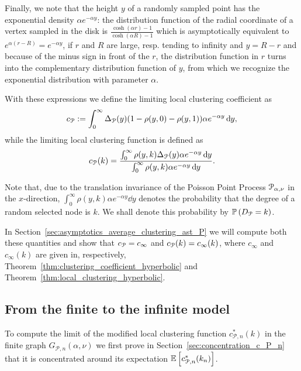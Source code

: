 Finally, we note that the height $y$ of a randomly sampled point has the exponential density $\alpha e^{-\alpha y}$: the distribution function of the radial coordinate of a vertex sampled in the disk is $\frac{\cosh(\alpha  r)-1}{\cosh(\alpha R)-1}$ which is asymptotically equivalent to $e^{\alpha(r-R)} = e^{-\alpha y}$, if $r$ and $R$ are large, resp. tending to infinity and $y=R-r$ and because of the minus sign in front of the $r$, the distribution function in $r$ turns into the complementary distribution function of $y$, from which we recognize the exponential distribution with parameter $\alpha$.


With these expressions we define the limiting local clustering coefficient as
\begin{equation}\label{eq:def_average_clustering_infinite_model}
	c_{{\mathcal P}} := \int_0^\infty \Delta_{{\mathcal P}}(y) (1 - \rho(y,0) - \rho(y,1)) \alpha e^{-\alpha y} \operatorname{\mathrm{d}\hspace{-2pt}} y,
\end{equation}
while the limiting local clustering function is defined as
\begin{equation}\label{eq:def_c_infty_k}
	c_{{\mathcal P}}(k) = \frac{\int_0^\infty \rho(y,k) \Delta_{{\mathcal P}}(y) \alpha e^{-\alpha y} \operatorname{\mathrm{d}\hspace{-2pt}} y}{\int_0^\infty \rho(y,k) \alpha e^{-\alpha y} \operatorname{\mathrm{d}\hspace{-2pt}} y}.
\end{equation}

Note that, due to the translation invariance of the Poisson Point Process ${\mathcal P}_{\alpha, \nu}$ in the $x$-direction, $\int_0^\infty \rho(y,k) \alpha e^{-\alpha y} \dd y$ denotes the probability that the degree of a random selected node is $k$. We shall denote this probability by $\mathbb{P}\left(D_{{\mathcal P}} = k\right)$.

In Section~\ref{sec:asymptotics_average_clustering_ast_P} we will compute both these quantities and show that $c_{{\mathcal P}} = c_\infty$ and $c_{{\mathcal P}}(k) = c_\infty(k)$, where $c_\infty$ and $c_\infty(k)$ are given in, respectively, Theorem~\ref{thm:clustering_coefficient_hyperbolic} and Theorem~\ref{thm:local_clustering_hyperbolic}.

\subsection{From the finite to the infinite model}

To compute the limit of the modified local clustering function $c_{\mathcal{P},n}^\ast(k)$ in the finite graph $G_{\mathcal{P},n}(\alpha, \nu)$ we first prove in Section~\ref{sec:concentration_c_P_n} that it is concentrated around its expectation $\mathbb{E}\left[c_{\mathcal{P},n}^\ast(k_n)\right]$.

